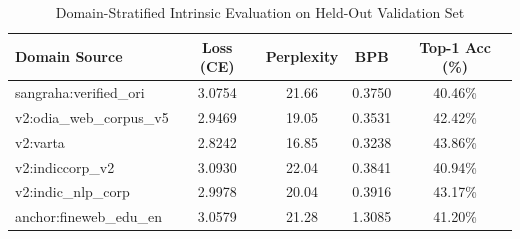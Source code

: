 \begin{table}[ht]
\centering
\caption{Domain-Stratified Intrinsic Evaluation on Held-Out Validation Set}
\begin{tabular}{lcccc}
\hline
\textbf{Domain Source} & \textbf{Loss (CE)} & \textbf{Perplexity} & \textbf{BPB} & \textbf{Top-1 Acc (\%)} \\
\hline
sangraha:verified\_ori & 3.0754 & 21.66 & 0.3750 & 40.46\% \\
v2:odia\_web\_corpus\_v5 & 2.9469 & 19.05 & 0.3531 & 42.42\% \\
v2:varta & 2.8242 & 16.85 & 0.3238 & 43.86\% \\
v2:indiccorp\_v2 & 3.0930 & 22.04 & 0.3841 & 40.94\% \\
v2:indic\_nlp\_corp & 2.9978 & 20.04 & 0.3916 & 43.17\% \\
anchor:fineweb\_edu\_en & 3.0579 & 21.28 & 1.3085 & 41.20\% \\
\hline
\end{tabular}
\end{table}

